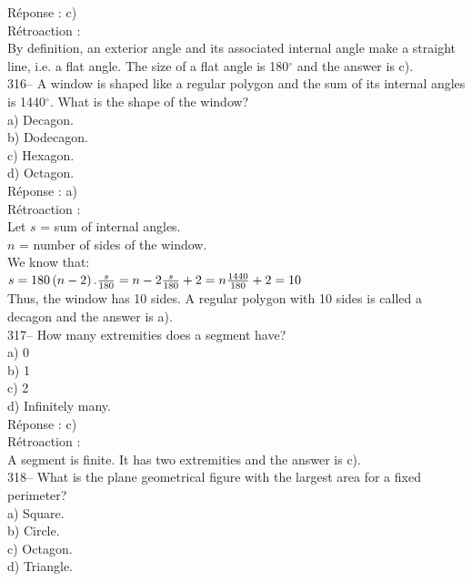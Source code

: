 \documentclass[letterpaper, 12pt]{article}
\begin{document}
R\'eponse : c)\\

R\'etroaction : \\
By definition, an exterior angle and its associated internal angle
make a straight line, i.e. a flat angle.
The size of a flat angle is 180$^{\circ}$ and the answer is c).\\

316-- A window is shaped like a regular polygon and the sum of its internal angles is 1440$^{\circ}$. What is the shape of the window?\\

a) Decagon.\\
b) Dodecagon.\\
c) Hexagon. \\
d) Octagon.\\

R\'eponse : a)\\

R\'etroaction : \\
Let $s$ = sum of internal angles.\\
$n$ = number of sides of the window.\\[2mm]
We know that:\\[2mm]
$s = 180 \left( n-2\right). \\[2mm]
\frac{s}{180}=n-2\\[2mm]
\frac{s}{180}+2=n\\[2mm]
\frac{1440}{180}+2=10$\\[2mm]
Thus, the window has 10 sides. A regular polygon with 10 sides is called a decagon and the answer is a).\\

317-- How many extremities does a segment have?\\

a) 0\\
b) 1\\
c) 2\\
d) Infinitely many.\\

R\'eponse : c)\\

R\'etroaction : \\
A segment is finite. It has two extremities and the answer is c).\\

318-- What is the plane geometrical figure with the largest area for a fixed perimeter?\\

a) Square.\\
b) Circle.\\
c) Octagon.\\
d) Triangle.\\
\end{document}
